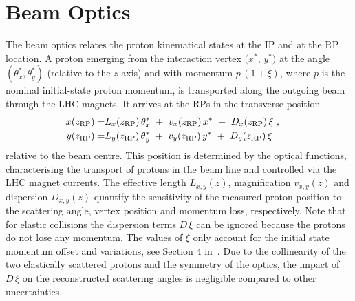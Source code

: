 \section{Beam Optics}
\label{sec:beam optics}

The beam optics relates the proton kinematical states at the IP and at the RP location. A proton emerging from the interaction vertex $(x^*$, $y^*)$ at the angle $(\theta_x^*,\theta_y^*)$ (relative to the $z$ axis) and with momentum $p\,(1+\xi)$, where $p$ is the nominal initial-state proton momentum, is transported along the outgoing beam through the LHC magnets. It arrives at the RPs in the transverse position
\begin{equation}
\label{eq:prot trans}
	\begin{aligned}
		x(z_{\rm RP}) =& L_x(z_{\rm RP})\, \theta_x^*\ +\ v_x(z_{\rm RP})\, x^*\ +\ D_x(z_{\rm RP})\, \xi\ ,\cr
		y(z_{\rm RP}) =& L_y(z_{\rm RP})\, \theta_y^*\ +\ v_y(z_{\rm RP})\, y^*\ +\ D_y(z_{\rm RP})\, \xi \quad
	\end{aligned}
\end{equation}
relative to the beam centre. This position is determined by the optical functions, characterising the transport of protons in the beam line and controlled via the LHC magnet currents.
The effective length $L_{x,y}(z)$, magnification $v_{x,y}(z)$ and dispersion $D_{x,y}(z)$ quantify the sensitivity of the measured proton position to the scattering angle, vertex position and momentum loss, respectively. Note that for elastic collisions the dispersion terms $D\,\xi$ can be ignored because the protons do not lose any momentum. The values of $\xi$ only account for the initial state momentum offset and variations, see Section 4 in~\cite{totem-8tev-90m}. Due to the collinearity of the two elastically scattered protons and the symmetry of the optics, the impact of $D\,\xi$ on the reconstructed scattering angles is negligible compared to other uncertainties.


